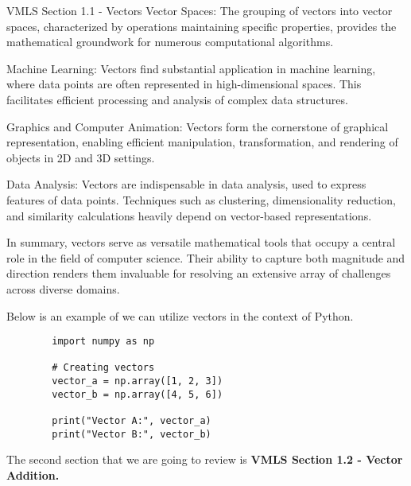 \begin{notes}{VMLS Section 1.1 - Vectors}
    Vector Spaces: The grouping of vectors into vector spaces, characterized by operations maintaining specific properties, provides the mathematical groundwork for numerous computational algorithms.

    Machine Learning: Vectors find substantial application in machine learning, where data points are often represented in high-dimensional spaces. This facilitates efficient processing and analysis 
    of complex data structures.

    Graphics and Computer Animation: Vectors form the cornerstone of graphical representation, enabling efficient manipulation, transformation, and rendering of objects in 2D and 3D settings.

    Data Analysis: Vectors are indispensable in data analysis, used to express features of data points. Techniques such as clustering, dimensionality reduction, and similarity calculations heavily 
    depend on vector-based representations.

    In summary, vectors serve as versatile mathematical tools that occupy a central role in the field of computer science. Their ability to capture both magnitude and direction renders them invaluable 
    for resolving an extensive array of challenges across diverse domains.
    
    \begin{Highlight}
        Below is an example of we can utilize vectors in the context of Python.

        \begin{verbatim}
        import numpy as np

        # Creating vectors
        vector_a = np.array([1, 2, 3])
        vector_b = np.array([4, 5, 6])

        print("Vector A:", vector_a)
        print("Vector B:", vector_b)
        \end{verbatim}
    \end{Highlight}
\end{notes}

The second section that we are going to review is \textbf{VMLS Section 1.2 - Vector Addition.}

